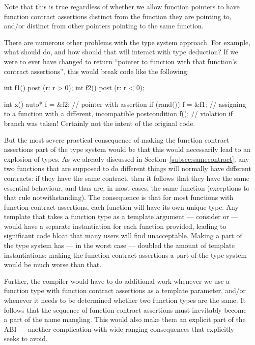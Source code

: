 Note that this is true regardless of whether we allow function pointers to have function contract assertions distinct from the function they are pointing to, and/or distinct from other pointers pointing to the same function.

There are numerous other problems with the type system approach. For example, what should  do, and how should that will interact with type deduction? If we were to ever have  changed to return ``pointer to function with that function's contract assertions'', this would break code like the following:
\begin{codeblock}
int f1() post (r: r > 0);
int f2() post (r: r < 0);

int x() {
  auto* f = &f2;   // pointer with assertion 
  if (rand()) {
    f = &f1;  // assigning to a function with a different, incompatible postcondition
  }
  f();  // violation if branch was taken! Certainly not the intent of the original code.
}
\end{codeblock}
But the most severe practical consequence of making the function contract assertions part of the type system would be that this would necessarily lead to an explosion of types. As we already discussed in Section~\ref{subsec:samecontract}, any two functions that are supposed to do different things will normally have different contracts: if they have the same contract, then it follows that they have the same essential behaviour, and thus are, in most cases, the same function (exceptions to that rule notwithstanding). The consequence is that for most functions with function contract assertions, each function will have its own unique type. Any template that takes a function type as a template argument --- consider  or  --- would have a separate instantiation for each function provided, leading to significant code bloat that many users will find unacceptable. Making  a part of the type system has --- in the worst case --- doubled the amount of template instantiations; making the function contract assertions a part of the type system would be much worse than that.

Further, the compiler would have to do additional work whenever we use a function type with function contract assertions as a template parameter, and/or whenever it needs to be determined whether two function types are the same. It follows that the sequence of function contract assertions must inevitably become a part of the name mangling. This would also make them an explicit part of the ABI --- another complication with wide-ranging consequences that \cite{P2900R7} explicitly seeks to avoid.

